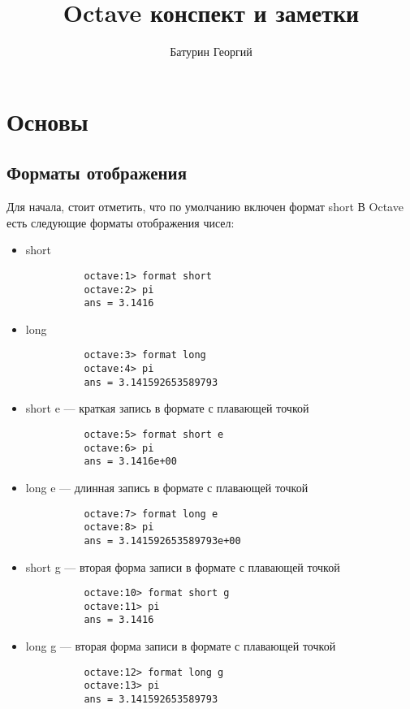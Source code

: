 \documentclass[12pt, a4paper,oneside]{book}
\title{Octave конспект и заметки}
\author{Батурин Георгий}
\date{}
\begin{document}
\tableofcontents

\chapter{Основы}
\section{Форматы отображения}
Для начала, стоит отметить, что по умолчанию включен формат short
В Octave есть следующие форматы отображения чисел:
\begin{itemize}
  \item{short}
        \begin{lstlisting}
          octave:1> format short
          octave:2> pi
          ans = 3.1416
        \end{lstlisting}

  \item{long}
        \begin{lstlisting}
          octave:3> format long
          octave:4> pi
          ans = 3.141592653589793
        \end{lstlisting}

  \item{short e --- краткая запись в формате с плавающей точкой}
        \begin{lstlisting}
          octave:5> format short e
          octave:6> pi
          ans = 3.1416e+00
        \end{lstlisting}

  \item{long e --- длинная запись в формате с плавающей точкой}
        \begin{lstlisting}
          octave:7> format long e
          octave:8> pi
          ans = 3.141592653589793e+00
        \end{lstlisting}

  \item{short g --- вторая форма записи в формате с плавающей точкой}
        \begin{lstlisting}
          octave:10> format short g
          octave:11> pi
          ans = 3.1416
        \end{lstlisting}

  \item{long g --- вторая форма записи в формате с плавающей точкой}
        \begin{lstlisting}
          octave:12> format long g
          octave:13> pi
          ans = 3.141592653589793
        \end{lstlisting}


\end{itemize}
\end{document}
